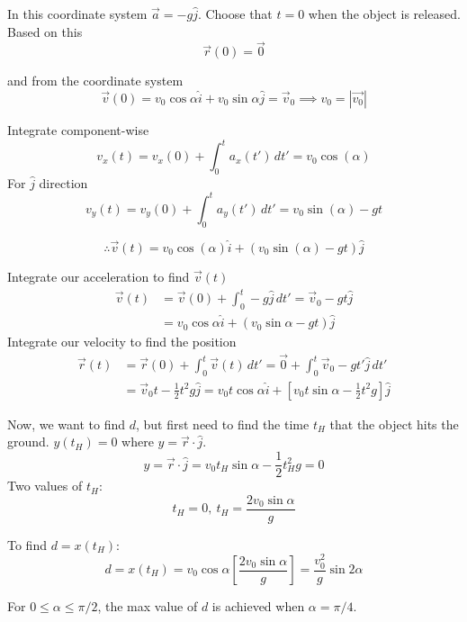 \documentclass[10pt]{scrartcl}
\begin{document}
\begin{example}[Projectiles]
\begin{center}
\begin{tikzpicture}
\end{tikzpicture}
	\end{center}
	
	In this coordinate system $\vec{a} = -g\hat{j}$. Choose that $t = 0$ when the object is released. Based on this \[\vec{r}(0) = \vec{0}\]

    and from the coordinate system
    \[\vec{v}(0) = v_0\cos\alpha\hat{i} + v_0\sin\alpha\hat{j} = \vec{v}_0 \implies v_0 = |\vec{v_0}|\]

    Integrate component-wise
    \[v_x(t) = v_x(0) + \int_0^t a_x(t')\,dt' = v_0\cos(\alpha)\]
    For $\hat{j}$ direction
    \[v_y(t) = v_y(0) + \int_0^t a_y(t')\,dt' = v_0\sin(\alpha) - gt\]

    \[\therefore \vec{v}(t) = v_0\cos(\alpha)\hat{i} + (v_0\sin(\alpha) - gt)\hat{j}\]

	Integrate our acceleration to find $\vec{v}(t)$
	\[\begin{aligned}\vec{v}(t) &= \vec{v}(0) + \int_0^t -g\hat{j}\,dt' = \vec{v}_0 -gt\hat{j} \\ 
	&= v_0\cos\alpha\hat{i} + (v_0\sin\alpha -gt)\hat{j}
\end{aligned}
\]
	Integrate our velocity to find the position
	\[\begin{aligned}
\vec{r}(t) &= \vec{r}(0) + 	\int_0^t \vec{v}(t)\,dt' = \vec{0} + \int_0^t\vec{v}_0 -gt'\hat{j}\,dt'\\
&= \vec{v}_0t - \textstyle{\frac{1}{2}}t^2g\hat{j} = v_0t\cos\alpha\hat{i} + [v_0t\sin\alpha - \textstyle{\frac{1}{2}}t^2g]\hat{j}
\end{aligned}
\]

Now, we want to find $d$, but first need to find the time $t_H$ that the object hits the ground.
$y(t_H) = 0$ where $y = \vec{r}\cdot\hat{j}$.
\[y = \vec{r}\cdot\hat{j}= v_0t_H\sin\alpha -\textstyle{\frac{1}{2}}t_H^2g = 0\]
Two values of $t_H$:
\[t_H = 0,~ t_H = \frac{2v_0\sin\alpha}{g}\]

To find $d = x(t_H)$:
\[d = x(t_H) = v_0\cos\alpha\left[\frac{2v_0\sin\alpha}{g}\right] = \frac{v_0^2}{g}\sin 2\alpha\]

For $0 \leq \alpha \leq \pi/2$, the max value of $d$ is achieved when $\alpha = \pi/4$.
\end{example}~\\
\end{document}
